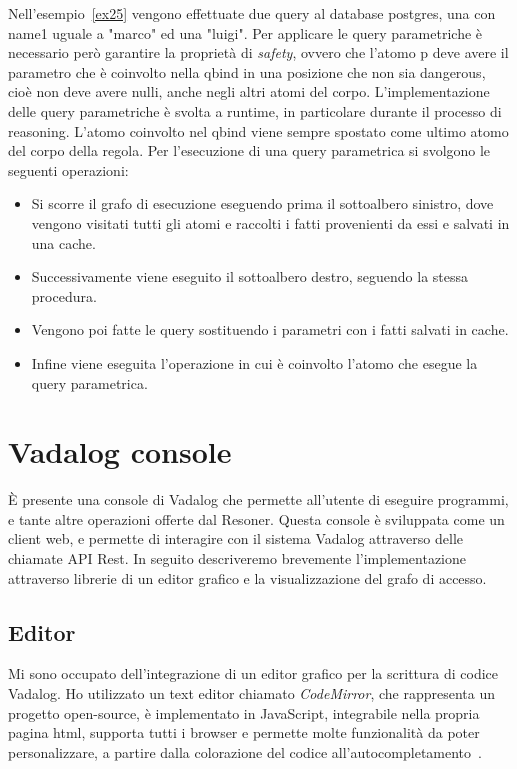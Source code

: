 Nell'esempio~\ref{ex25} vengono effettuate due query al database postgres, una con name1 uguale a "marco" ed una "luigi". \newline
Per applicare le query parametriche è necessario però garantire la proprietà di \emph{safety}, ovvero che l'atomo p deve avere il parametro che è coinvolto nella qbind in una posizione che non sia dangerous, cioè non deve avere nulli, anche negli altri atomi del corpo. \newline
L'implementazione delle query parametriche è svolta a runtime, in particolare durante il processo di reasoning. L'atomo coinvolto nel qbind viene sempre spostato come ultimo atomo del corpo della regola. Per l'esecuzione di una query parametrica si svolgono le seguenti operazioni: 
\begin{itemize}
	\item Si scorre il grafo di esecuzione eseguendo prima il sottoalbero sinistro, dove vengono visitati tutti gli atomi e raccolti i fatti provenienti da essi e salvati in una cache.
	\item Successivamente viene eseguito il sottoalbero destro, seguendo la stessa procedura.
	\item Vengono poi fatte le query sostituendo i parametri con i fatti salvati in cache.
	\item Infine viene eseguita l'operazione in cui è coinvolto l'atomo che esegue la query parametrica.
\end{itemize}

\section{Vadalog console}

È presente una console di Vadalog che permette all'utente di eseguire programmi, e tante altre operazioni offerte dal Resoner. \newline
Questa console è sviluppata come un client web, e permette di interagire con il sistema Vadalog attraverso delle chiamate API Rest. \newline
In seguito descriveremo brevemente l'implementazione attraverso librerie di un editor grafico e la visualizzazione del grafo di accesso. 

\subsection{Editor}

Mi sono occupato dell'integrazione di un editor grafico per la scrittura di codice Vadalog. \newline
Ho utilizzato un text editor chiamato \emph{CodeMirror}, che rappresenta un progetto open-source, è implementato in JavaScript, integrabile nella propria pagina html, supporta tutti i browser e permette molte funzionalità da poter personalizzare, a partire dalla colorazione del codice all'autocompletamento~\cite{CODEMIRROR}.

